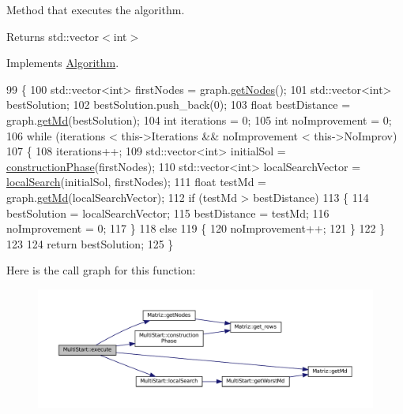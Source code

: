 Method that executes the algorithm. 

\begin{DoxyReturn}{Returns}
std\+::vector$<$int$>$ 
\end{DoxyReturn}


Implements \hyperlink{classAlgorithm_af6ea9eb9a6dbd41896e3fd7dabac096b}{Algorithm}.


\begin{DoxyCode}
99 \{
100   std::vector<int> firstNodes = graph.\hyperlink{classMatriz_a394b84a5ec13fd2f4d202ab218680afe}{getNodes}();
101   std::vector<int> bestSolution;
102   bestSolution.push\_back(0);
103   \textcolor{keywordtype}{float} bestDistance = graph.\hyperlink{classMatriz_a8df14a27d791f24206dd633b2a685c5b}{getMd}(bestSolution);
104   \textcolor{keywordtype}{int} iterations = 0;
105   \textcolor{keywordtype}{int} noImprovement = 0;
106   \textcolor{keywordflow}{while} (iterations < this->Iterations && noImprovement < this->NoImprov)
107   \{
108     iterations++;
109     std::vector<int> initialSol = \hyperlink{classMultiStart_a29c5796648ede3e6c7fe8ca8043f8187}{constructionPhase}(firstNodes);
110     std::vector<int> localSearchVector = \hyperlink{classMultiStart_af27ae5dbba5f924070f103b7bf5987a3}{localSearch}(initialSol, firstNodes);
111     \textcolor{keywordtype}{float} testMd = graph.\hyperlink{classMatriz_a8df14a27d791f24206dd633b2a685c5b}{getMd}(localSearchVector);
112     \textcolor{keywordflow}{if} (testMd > bestDistance)
113     \{
114       bestSolution = localSearchVector;
115       bestDistance = testMd;
116       noImprovement = 0;
117     \}
118     \textcolor{keywordflow}{else}
119     \{
120       noImprovement++;
121     \}
122   \}
123 
124   \textcolor{keywordflow}{return} bestSolution;
125 \}
\end{DoxyCode}
Here is the call graph for this function\+:\nopagebreak
\begin{figure}[H]
\begin{center}
\leavevmode
\includegraphics[width=350pt]{classMultiStart_a9d842b1f602c4b8a47bf6d88d483ccae_cgraph}
\end{center}
\end{figure}
